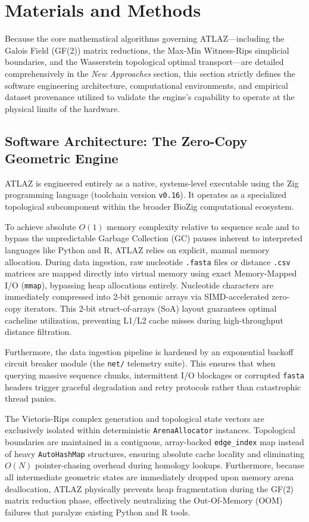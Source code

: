 \section{Materials and Methods}

Because the core mathematical algorithms governing ATLAZ---including the Galois Field (GF(2)) matrix reductions, the Max-Min Witness-Rips simplicial boundaries, and the Wasserstein topological optimal transport---are detailed comprehensively in the \textit{New Approaches} section, this section strictly defines the software engineering architecture, computational environments, and empirical dataset provenance utilized to validate the engine's capability to operate at the physical limits of the hardware.

\subsection{Software Architecture: The Zero-Copy Geometric Engine}
ATLAZ is engineered entirely as a native, systems-level executable using the Zig programming language (toolchain version \texttt{v0.16}). It operates as a specialized topological subcomponent within the broader BioZig computational ecosystem. 

To achieve absolute $O(1)$ memory complexity relative to sequence scale and to bypass the unpredictable Garbage Collection (GC) pauses inherent to interpreted languages like Python and R, ATLAZ relies on explicit, manual memory allocation. During data ingestion, raw nucleotide \texttt{.fasta} files or distance \texttt{.csv} matrices are mapped directly into virtual memory using exact Memory-Mapped I/O (\texttt{mmap}), bypassing heap allocations entirely. Nucleotide characters are immediately compressed into 2-bit genomic arrays via SIMD-accelerated zero-copy iterators. This 2-bit struct-of-arrays (SoA) layout guarantees optimal cacheline utilization, preventing L1/L2 cache misses during high-throughput distance filtration.

Furthermore, the data ingestion pipeline is hardened by an exponential backoff circuit breaker module (the \texttt{net/} telemetry suite). This ensures that when querying massive sequence chunks, intermittent I/O blockages or corrupted \texttt{fasta} headers trigger graceful degradation and retry protocols rather than catastrophic thread panics.

The Vietoris-Rips complex generation and topological state vectors are exclusively isolated within deterministic \texttt{ArenaAllocator} instances. Topological boundaries are maintained in a contiguous, array-backed \texttt{edge\_index} map instead of heavy \texttt{AutoHashMap} structures, ensuring absolute cache locality and eliminating $O(N)$ pointer-chasing overhead during homology lookups. Furthermore, because all intermediate geometric states are immediately dropped upon memory arena deallocation, ATLAZ physically prevents heap fragmentation during the GF(2) matrix reduction phase, effectively neutralizing the Out-Of-Memory (OOM) failures that paralyze existing Python and R tools. 


